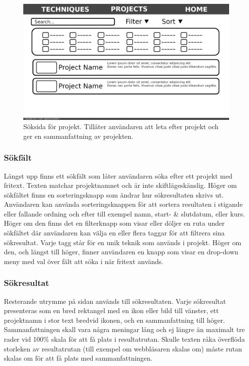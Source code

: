 \documentclass{liu_mall}
\begin{document}
    \begin{figure}[h!]
        \centering
        \includegraphics{LOFI Projects}
        \caption{Söksida för projekt. Tillåter användaren att leta efter projekt och ger en sammanfattning av projekten.}
        \label{fig:Low Fidelity-Prototyp Projects}
    \end{figure}

    \subsubsection{Sökfält}
        Längst upp finns ett sökfält som låter användaren söka efter ett projekt med fritext. Texten matchar projektnamnet och är inte skiftlägeskänslig. Höger om sökfältet finns en sorteringsknapp som ändrar hur sökresultaten skrivs ut. Användaren kan använda sorteringsknappen för att sortera resultaten i stigande eller fallande ordning och efter till exempel namn, start- \& slutdatum, eller kurs. Höger om den finns det en filterknapp som visar eller döljer en ruta under sökfältet där användaren kan välja en eller flera taggar för att filtrera sina sökresultat. Varje tagg står för en unik teknik som används i projekt. Höger om den, och längst till höger, finner användaren en knapp som visar en drop-down meny med val över fält att söka i när fritext används.

    \subsubsection{Sökresultat}
        Resterande utrymme på sidan används till sökresultaten. Varje sökresultat presenteras som en bred rektangel med en ikon eller bild till vänster, ett projektnamn i stor text bredvid ikonen, och en sammanfattning till höger. Sammanfattningen skall vara några meningar lång och ej längre än maximalt tre rader vid 100\% skala för att få plats i resultatrutan. Skulle texten råka överflöda storleken av resultatrutan (till exempel om webbläsaren skalas om) måste rutan skalas om för att få plats med sammanfattningen.
\end{document}
